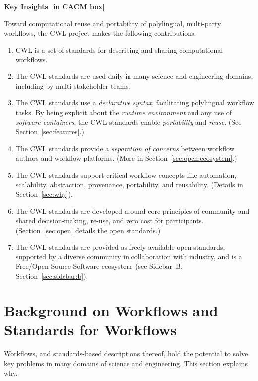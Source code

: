 \documentclass[sigconf,revew,screen,timestamp,nonacm]{acmart}
\newcommand{\modification}[1]{{\color{blue} #1}}
\begin{document}
\textbf{Key Insights [in CACM box]}

Toward computational reuse and portability of polylingual, multi-party workflows, \modification{the CWL project} makes the following contributions:

\begin{enumerate}
\item
  {CWL is a set of standards for describing and sharing computational workflows.}
\item
  {\modification{The CWL standards are} used daily in many science and engineering domains, including by multi-stakeholder teams.}
\item
  {\modification{The CWL standards use} a \textit{declarative syntax}, facilitating polylingual workflow tasks. By being explicit about the \textit{runtime environment} and any use of \textit{software containers}, \modification{the CWL standards} enable \textit{portability} and \textit{reuse}. (See Section~\ref{sec:features}.)}
\item
  {The CWL standards provide a \textit{separation of concerns} between workflow authors and workflow platforms. (More in Section~\ref{sec:open:ecosystem}.)}
\item
  {The CWL standards support critical workflow concepts like automation, scalability, abstraction, provenance, portability, and reusability. (Details in Section~\ref{sec:why}).}
\item
  {\modification{The CWL standards are} developed around core principles of community and shared decision-making, re-use, and zero cost for participants. (Section~\ref{sec:open} details the open standards.)}
\item
  {\modification{The CWL standards are} provided as freely available open standards, supported by a diverse community in collaboration with industry, and is a Free/Open Source Software ecosystem~(see Sidebar~B, Section~\ref{sec:sidebar:b}).}
\end{enumerate}

\section{Background on Workflows and Standards for Workflows}\label{sec:bg}\label{sec:why}

Workflows, and standards-based descriptions thereof, hold the potential to solve key problems in many domains of science and engineering. This section explains why.
\end{document}

